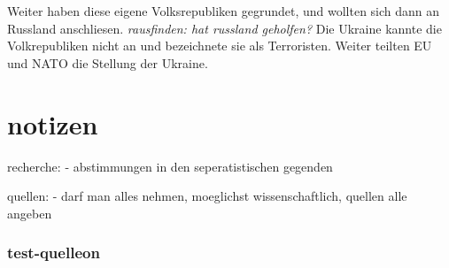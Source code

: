 \documentclass{article}
\begin{document}
Weiter haben diese eigene Volksrepubliken gegrundet, und wollten sich dann an
Russland anschliesen. \textit{rausfinden: hat russland geholfen?}
Die Ukraine kannte die Volkrepubliken nicht an und bezeichnete sie als Terroristen.
Weiter teilten EU und NATO die Stellung der Ukraine.







\section{notizen}
recherche:
- abstimmungen in den seperatistischen gegenden


quellen:
- darf man alles nehmen, moeglichst wissenschaftlich, quellen alle angeben
\subsubsection{test-quelleon}
~\cite{was-ist-geschehen}
~\cite{what-could-come-next}
~\cite{open-source-intelligence}
~\cite{putins-war}
~\cite{avoiding-a-long-war}
~\cite{how-big-is-the-storm}
~\cite{why-did-putin}



\clearpage
\printbibliography
\end{document}
